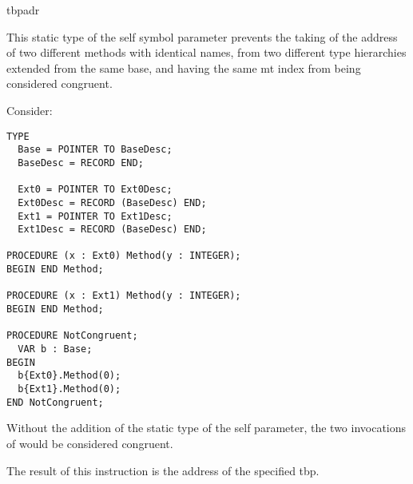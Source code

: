 \begin{instruction}{tbpadr}

  \begin{notes}
    This static type of the self symbol parameter prevents the taking
    of the address of two different methods with identical names, from
    two different type hierarchies extended from the same base, and
    having the same \ac{mt} index from being considered
    congruent.

    Consider:

\begin{verbatim}
TYPE
  Base = POINTER TO BaseDesc;
  BaseDesc = RECORD END;

  Ext0 = POINTER TO Ext0Desc;
  Ext0Desc = RECORD (BaseDesc) END;
  Ext1 = POINTER TO Ext1Desc;
  Ext1Desc = RECORD (BaseDesc) END;

PROCEDURE (x : Ext0) Method(y : INTEGER);
BEGIN END Method;

PROCEDURE (x : Ext1) Method(y : INTEGER);
BEGIN END Method;

PROCEDURE NotCongruent;
  VAR b : Base;
BEGIN
  b{Ext0}.Method(0);
  b{Ext1}.Method(0);
END NotCongruent;
\end{verbatim}

    Without the addition of the static type of the self parameter, the
    two invocations of  would be considered congruent.
  \end{notes}

  \begin{results}
  \item The result of this instruction is the address of the specified
    \ac{tbp}.
  \end{results}


  \begin{operands}
  \item {}


\end{operands}
\end{instruction}
